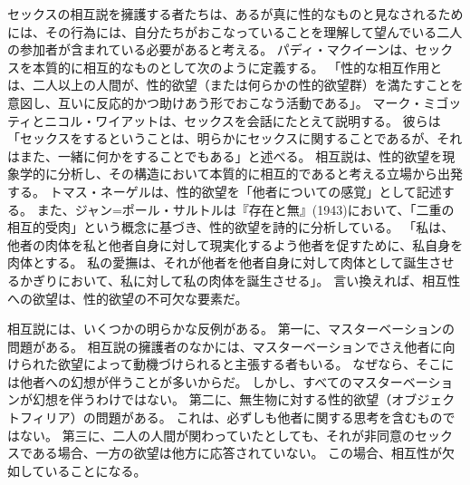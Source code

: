 \documentclass[paper=a4,book,openany]{jlreq}
\begin{document}
セックスの相互説を擁護する者たちは、あるが真に性的なものと見なされるためには、その行為には、自分たちがおこなっていることを理解して望んでいる二人の参加者が含まれている必要があると考える。
パディ・マクイーンは、セックスを本質的に相互的なものとして次のように定義する。
「性的な相互作用とは、二人以上の人間が、性的欲望（または何らかの性的欲望群）を満たすことを意図し、互いに反応的かつ助けあう形でおこなう活動である」\citep{mcqueen21:_sexual_inter_sexual_infid}。
マーク・ミゴッティとニコル・ワイアットは、セックスを会話にたとえて説明する。
彼らは「セックスをするということは、明らかにセックスに関することであるが、それはまた、一緒に何かをすることでもある」と述べる\citep[p.19]{migotti17:_very_idea_sex_robot}。
相互説は、性的欲望を現象学的に分析し、その構造において本質的に相互的であると考える立場から出発する。
トマス・ネーゲルは、性的欲望を「他者についての感覚」として記述する\citep[p.8]{nagel69:_sexual_perver}。
また、ジャン=ポール・サルトルは『存在と無』(1943)において、「二重の相互的受肉」という概念に基づき、性的欲望を詩的に分析している。
「私は、他者の肉体を私と他者自身に対して現実化するよう他者を促すために、私自身を肉体とする。
私の愛撫は、それが他者を他者自身に対して肉体として誕生させるかぎりにおいて、私に対して私の肉体を誕生させる」\citep[p.514]{sartre43:_being_nothin}。
言い換えれば、相互性への欲望は、性的欲望の不可欠な要素だ。

相互説には、いくつかの明らかな反例がある。
第一に、マスターベーションの問題がある。
相互説の擁護者のなかには、マスターベーションでさえ他者に向けられた欲望によって動機づけられると主張する者もいる。
なぜなら、そこには他者への幻想が伴うことが多いからだ。
しかし、すべてのマスターベーションが幻想を伴うわけではない。
第二に、無生物に対する性的欲望（オブジェクトフィリア）の問題がある。
これは、必ずしも他者に関する思考を含むものではない。
第三に、二人の人間が関わっていたとしても、それが非同意のセックスである場合、一方の欲望は他方に応答されていない。
この場合、相互性が欠如していることになる。
\end{document}
